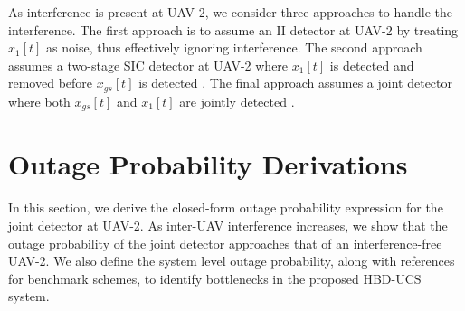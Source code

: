 As interference is present at UAV-2, we consider three approaches to handle the interference. The first approach is to assume an II detector at UAV-2 by treating $x_1[t]$ as noise, thus effectively ignoring interference. The second approach assumes a two-stage SIC detector at UAV-2 where $x_1[t]$ is detected and removed before $x_{gs}[t]$ is detected \cite{narasimhan2007individual}. The final approach assumes a joint detector where both $x_{gs}[t]$ and $x_1[t]$ are jointly detected \cite{blomer2009transmission}.

\begin{table}[]
\centering
\caption{Summary of Important Notations}
\label{table:JD_HBD_UCS_summary_impt_notations} 
\end{table}

\section{Outage Probability Derivations} \label{JD_HBD_UCS_subsec_UAV2_JD}
In this section, we derive the closed-form outage probability expression for the joint detector at UAV-2. As inter-UAV interference increases, we show that the outage probability of the joint detector approaches that of an interference-free UAV-2. We also define the system level outage probability, along with references for benchmark schemes, to identify bottlenecks in the proposed HBD-UCS system. 

